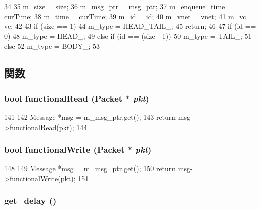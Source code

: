 \begin{DoxyCode}
34 {
35     m_size = size;
36     m_msg_ptr = msg_ptr;
37     m_enqueue_time = curTime;
38     m_time = curTime;
39     m_id = id;
40     m_vnet = vnet;
41     m_vc = vc;
42 
43     if (size == 1) {
44         m_type = HEAD_TAIL_;
45         return;
46     }
47     if (id == 0)
48         m_type = HEAD_;
49     else if (id == (size - 1))
50         m_type = TAIL_;
51     else
52         m_type = BODY_;
53 }
\end{DoxyCode}


\subsection{関数}
\hypertarget{classflit_a729f57f557bb42c045c47d9388f1030e}{
\subsubsection[{functionalRead}]{\setlength{\rightskip}{0pt plus 5cm}bool functionalRead ({\bf Packet} $\ast$ {\em pkt})}}
\label{classflit_a729f57f557bb42c045c47d9388f1030e}



\begin{DoxyCode}
141 {
142     Message *msg = m_msg_ptr.get();
143     return msg->functionalRead(pkt);
144 }
\end{DoxyCode}
\hypertarget{classflit_a14bf46f4c6bb79e5357096af6b9dbffa}{
\subsubsection[{functionalWrite}]{\setlength{\rightskip}{0pt plus 5cm}bool functionalWrite ({\bf Packet} $\ast$ {\em pkt})}}
\label{classflit_a14bf46f4c6bb79e5357096af6b9dbffa}



\begin{DoxyCode}
148 {
149     Message *msg = m_msg_ptr.get();
150     return msg->functionalWrite(pkt);
151 }
\end{DoxyCode}
\hypertarget{classflit_a0b5775391c8bacccecf70b147a7dd3e6}{
\subsubsection[{get\_\-delay}]{ get\_\-delay ()}}
\label{classflit_a0b5775391c8bacccecf70b147a7dd3e6}



